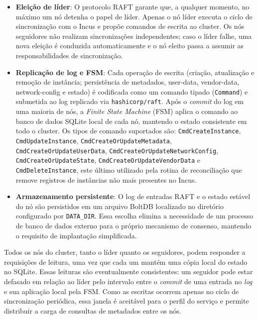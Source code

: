 \begin{itemize}
    \item \textbf{Eleição de líder}: O protocolo RAFT garante que, a qualquer momento, no máximo um nó detenha o papel de líder. Apenas o nó líder executa o ciclo de sincronização com o Incus e propõe comandos de escrita ao cluster. Os nós seguidores não realizam sincronizações independentes; caso o líder falhe, uma nova eleição é conduzida automaticamente e o nó eleito passa a assumir as responsabilidades de sincronização.

    \item \textbf{Replicação de log e FSM}: Cada operação de escrita (criação, atualização e remoção de instância; persistência de metadados, user-data, vendor-data, network-config e estado) é codificada como um comando tipado (\texttt{Command}) e submetida ao log replicado via \texttt{hashicorp/raft}. Após o \textit{commit} do log em uma maioria de nós, a \textit{Finite State Machine} (FSM) aplica o comando ao banco de dados SQLite local de cada nó, mantendo o estado consistente em todo o cluster. Os tipos de comando suportados são: \texttt{CmdCreateInstance}, \texttt{CmdUpdateInstance}, \texttt{CmdCreateOrUpdateMetadata}, \texttt{CmdCreateOrUpdateUserData}, \texttt{CmdCreateOrUpdateNetworkConfig}, \texttt{CmdCreateOrUpdateState}, \texttt{CmdCreateOrUpdateVendorData} e \texttt{CmdDeleteInstance}, este último utilizado pela rotina de reconciliação que remove registros de instâncias não mais presentes no Incus.

    \item \textbf{Armazenamento persistente}: O log de entradas RAFT e o estado estável do nó são persistidos em um arquivo BoltDB localizado no diretório configurado por \texttt{DATA\_DIR}. Essa escolha elimina a necessidade de um processo de banco de dados externo para o próprio mecanismo de consenso, mantendo o requisito de implantação simplificada.
\end{itemize}

Todos os nós do cluster, tanto o líder quanto os seguidores, podem responder a requisições de leitura, uma vez que cada um mantém uma cópia local do estado no SQLite. Essas leituras são eventualmente consistentes: um seguidor pode estar defasado em relação ao líder pelo intervalo entre o \textit{commit} de uma entrada no \textit{log} e sua aplicação local pela FSM. Como as escritas ocorrem apenas no ciclo de sincronização periódica, essa janela é aceitável para o perfil do serviço e permite distribuir a carga de consultas de metadados entre os nós.
